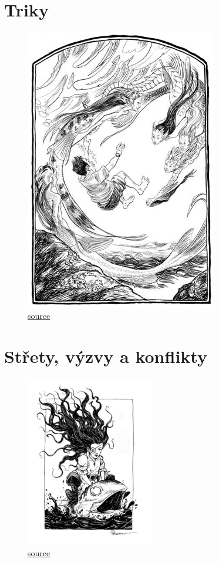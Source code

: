 \documentclass[12pt,a4paper,twoside,openany]{book}
\begin{document}
\chapter{Triky}
\label{chap:triky}


\begin{figure}[h!]
  \centering
  \caption{\href{https://cz.pinterest.com/pin/750623462885443700/}{source}}
  \includegraphics[width=0.75\textwidth]{ryba}
\end{figure}


\chapter{Střety, výzvy a konflikty}
\label{chap:jdesenavec}


\begin{figure}[h!]
  \centering
  \caption{\href{https://www.pinterest.com/pin/484418503638647556/}{source}}
  \includegraphics[width=0.5\textwidth]{zaba}
\end{figure}
\end{document}
